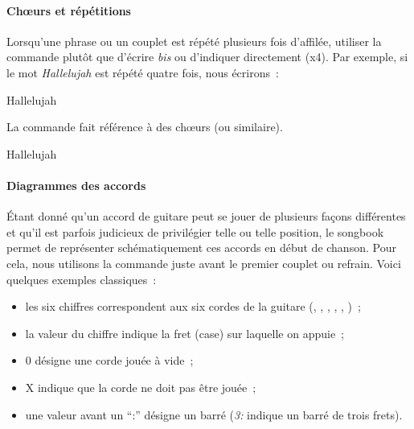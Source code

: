 \paragraph{Ch\oe{}urs et répétitions}
Lorsqu'une phrase ou un couplet est répété plusieurs fois d'affilée,
utiliser la commande  plutôt que d'écrire \emph{bis} ou
d'indiquer directement (x4). Par exemple, si le mot \emph{Hallelujah}
est répété quatre fois, nous écrirons~:

\begin{songbook}
Hallelujah 
\end{songbook}

La commande  fait référence à des chœurs (ou
similaire).

\begin{songbook}
Hallelujah 
\end{songbook}

\paragraph{Diagrammes des accords}
Étant donné qu'un accord de guitare peut se jouer de plusieurs façons
différentes et qu'il est parfois judicieux de privilégier telle ou
telle position, le songbook permet de représenter schématiquement ces
accords en début de chanson. Pour cela, nous utilisons la commande
 juste avant le premier couplet ou refrain. Voici
quelques exemples classiques~:

\begin{songbook}
\end{songbook}

\begin{itemize}
\item les six chiffres correspondent aux six cordes de la guitare
  (, , , ,
  , )~;
\item la valeur du chiffre indique la fret (case) sur laquelle on
  appuie~;
\item 0 désigne une corde jouée à vide~;
\item X indique que la corde ne doit pas être jouée~;
\item une valeur avant un ``:'' désigne un barré (\emph{3:} indique un
  barré de trois frets).
\end{itemize}

